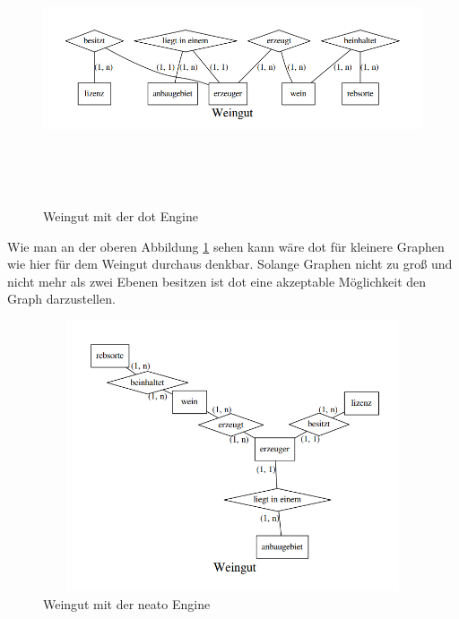 \begin{figure}[H]
	\begin{center}
		\includegraphics[width=16cm, height=8cm]{images/weingut_dot.png}
		\caption{Weingut mit der dot Engine}
		\label{wein_dot}
	\end{center}
\end{figure}

\noindent
Wie man an der oberen Abbildung \ref{wein_dot} sehen kann wäre dot für kleinere Graphen wie hier für dem Weingut durchaus denkbar. Solange Graphen nicht zu groß und nicht mehr als zwei Ebenen besitzen ist dot eine akzeptable Möglichkeit den Graph darzustellen.


\begin{figure}[H]
	\begin{center}
		\includegraphics[width=16cm, height=8cm]{images/weingut_neato.png}
		\caption{Weingut mit der neato Engine}
		\label{wein_neato}
	\end{center}
\end{figure}

